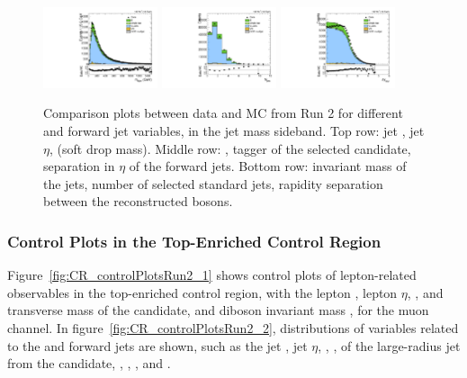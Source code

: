 \begin{figure}[htbp]
  \includegraphics[width=0.3\textwidth]{fig/controlPlots/SB_b1_allL_allP_allC_allD_Run2_lnujj_vbfMass.pdf}
  \includegraphics[width=0.3\textwidth]{fig/controlPlots/SB_b1_allL_allP_allC_allD_Run2_lnujj_nJets.pdf}
  \includegraphics[width=0.3\textwidth]{fig/controlPlots/SB_b1_allL_allP_allC_allD_Run2_dy.pdf}\\
  \caption{
    Comparison plots between data and MC from Run 2 for different \Vhad and \VBF forward jet variables, in the jet mass sideband.
    Top row: jet \pt, jet $\eta$, \MJ (soft drop mass).
    Middle row: \nsubjDDT, \DoubleB tagger of the selected \Vhad candidate, separation in $\eta$ of the \VBF forward jets.
    Bottom row: invariant mass of the \VBF jets, number of selected standard jets, rapidity separation between the reconstructed bosons.
  }
  \label{fig:SB_controlPlotsRun2_2}
\end{figure}

\subsubsection{Control Plots in the Top-Enriched Control Region}

Figure~\ref{fig:CR_controlPlotsRun2_1} shows control plots of lepton-related observables in the top-enriched control region, with the lepton \pt, lepton $\eta$, \ptmiss, \pt and transverse mass of the \Wlep candidate, and diboson invariant mass \MVV, for the muon channel.
In figure~\ref{fig:CR_controlPlotsRun2_2}, distributions of variables related to the \Vhad and \VBF forward jets are shown, such as the jet \pt, jet $\eta$, \MJ, \nsubjDDT, \DoubleB of the large-radius jet from the \Vhad candidate, \DetaVBF, \mjjVBF, \nJets, and \Dy.

